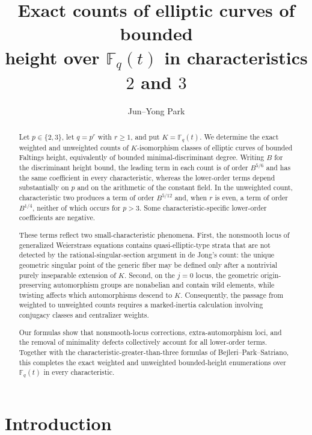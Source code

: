 \documentclass[a4paper,12pt]{amsart}
\title[Exact counts in characteristics $2$ and $3$]
{Exact counts of elliptic curves of bounded \\ height over $\mathbb F_q(t)$ in characteristics $2$ and $3$}
\author{Jun--Yong Park}
\date{}
\theoremstyle{definition}
\begin{document}
    \begin{abstract}
    Let $p\in\{2,3\}$, let $q=p^r$ with $r\geq1$, and put $K=\mathbb F_q(t)$.  We determine the exact weighted and unweighted counts of $K$-isomorphism classes of elliptic curves of bounded Faltings height, equivalently of bounded minimal-discriminant degree.  Writing $B$ for the discriminant height bound, the leading term in each count is of order $B^{5/6}$ and has the same coefficient in every characteristic, whereas the lower-order terms depend substantially on $p$ and on the arithmetic of the constant field.  In the unweighted count, characteristic two produces a term of order $B^{5/12}$ and, when $r$ is even, a term of order $B^{1/4}$, neither of which occurs for $p>3$.  Some characteristic-specific lower-order coefficients are negative.

    These terms reflect two small-characteristic phenomena.  First, the nonsmooth locus of generalized Weierstrass equations contains quasi-elliptic-type strata that are not detected by the rational-singular-section argument in de Jong's count: the unique geometric singular point of the generic fiber may be defined only after a nontrivial purely inseparable extension of $K$.  Second, on the $j=0$ locus, the geometric origin-preserving automorphism groups are nonabelian and contain wild elements, while twisting affects which automorphisms descend to $K$.  Consequently, the passage from weighted to unweighted counts requires a marked-inertia calculation involving conjugacy classes and centralizer weights.

    Our formulas show that nonsmooth-locus corrections, extra-automorphism loci, and the removal of minimality defects collectively account for all lower-order terms.  Together with the characteristic-greater-than-three formulas of Bejleri--Park--Satriano, this completes the exact weighted and unweighted bounded-height enumerations over $\mathbb F_q(t)$ in every characteristic.
    \end{abstract}

    \maketitle
    \vspace{-4ex}



    \section{Introduction}\label{sec:introduction}
\end{document}
